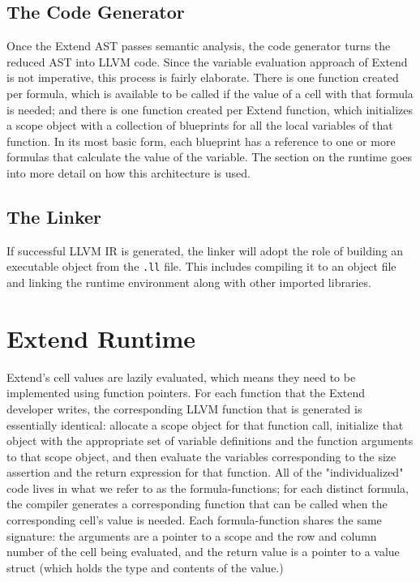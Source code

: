   \subsection{The Code Generator}
 Once the Extend AST passes semantic analysis, the code generator turns the reduced AST into LLVM code. Since the variable evaluation approach of Extend is not imperative, this process is fairly elaborate. There is one function created per formula, which is available to be called if the value of a cell with that formula is needed; and there is one function created per Extend function, which initializes a scope object with a collection of blueprints for all the local variables of that function. In its most basic form, each blueprint has a reference to one or more formulas that calculate the value of the variable. The section on the runtime goes into more detail on how this architecture is used.

  \subsection{The Linker}
  If successful LLVM IR is generated, the linker will adopt the role of building an executable object from the \texttt{.ll} file. This includes compiling it to an object file and linking the runtime environment along with other imported libraries.

  \section{Extend Runtime}
  Extend's cell values are lazily evaluated, which means they need to be implemented using function pointers. For each function that the Extend developer writes, the corresponding LLVM function that is generated is essentially identical: allocate a scope object for that function call, initialize that object with the appropriate set of variable definitions and the function arguments to that scope object, and then evaluate the variables corresponding to the size assertion and the return expression for that function. All of the "individualized" code lives in what we refer to as the formula-functions; for each distinct formula, the compiler generates a corresponding function that can be called when the corresponding cell's value is needed. Each formula-function shares the same signature: the arguments are a pointer to a scope and the row and column number of the cell being evaluated, and the return value is a pointer to a value struct (which holds the type and contents of the value.)

